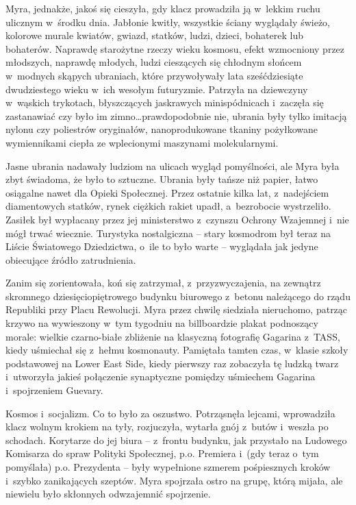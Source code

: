 \documentclass[oneside,polish,11pt,sfheadings]{mwbk}
\begin{document}
Myra, jednakże, jakoś się cieszyła, gdy klacz prowadziła ją w~lekkim
ruchu ulicznym w~środku dnia. Jabłonie kwitły, wszystkie ściany wyglądały
świeżo, kolorowe murale kwiatów, gwiazd, statków, ludzi, dzieci,
bohaterek lub bohaterów. Naprawdę starożytne rzeczy wieku kosmosu, efekt
wzmocniony przez młodszych, naprawdę młodych, ludzi cieszących się
chłodnym słońcem w~modnych skąpych ubraniach, które przywoływały lata
sześćdziesiąte dwudziestego wieku w~ich wesołym futuryzmie. Patrzyła na
dziewczyny w~wąskich trykotach, błyszczących jaskrawych minispódnicach i~zaczęła się zastanawiać czy było im zimno\ldots prawdopodobnie nie, ubrania
były tylko imitacją nylonu czy poliestrów oryginałów, nanoprodukowane
tkaniny pożyłkowane wymiennikami ciepła ze wplecionymi maszynami
molekularnymi.

Jasne ubrania nadawały ludziom na ulicach wygląd pomyślności, ale Myra
była zbyt świadoma, że było to sztuczne. Ubrania były tańsze niż papier,
łatwo osiągalne nawet dla Opieki Społecznej. Przez ostatnie kilka lat, z~nadejściem diamentowych statków, rynek ciężkich rakiet upadł, a~bezrobocie wystrzeliło. Zasiłek był wypłacany przez jej ministerstwo z~czynszu Ochrony Wzajemnej i~nie mógł trwać wiecznie. Turystyka
nostalgiczna -- stary kosmodrom był teraz na Liście Światowego
Dziedzictwa, o~ile to było warte -- wyglądała jak jedyne obiecujące
źródło zatrudnienia.

Zanim się zorientowała, koń się zatrzymał, z~przyzwyczajenia, na
zewnątrz skromnego dziesięciopiętrowego budynku biurowego z~betonu
należącego do rządu Republiki przy Placu Rewolucji. Myra przez chwilę
siedziała nieruchomo, patrząc krzywo na wywieszony w~tym tygodniu na
billboardzie plakat podnoszący morale: wielkie czarno-białe zbliżenie na
klasyczną fotografię Gagarina z~TASS, kiedy uśmiechał się z~hełmu
kosmonauty. Pamiętała tamten czas, w~klasie szkoły podstawowej na Lower
East Side, kiedy pierwszy raz zobaczyła tę ludzką twarz i~utworzyła
jakieś połączenie synaptyczne pomiędzy uśmiechem Gagarina i~spojrzeniem
Guevary.

Kosmos i~socjalizm. Co to było za oszustwo. Potrząsnęła lejcami,
wprowadziła klacz wolnym krokiem na tyły, rozjuczyła, wytarła gnój z~butów i~weszła po schodach. Korytarze do jej biura -- z~frontu budynku,
jak przystało na Ludowego Komisarza do spraw Polityki Społecznej, p.o.
Premiera i~(gdy teraz o~tym pomyślała) p.o. Prezydenta -- były wypełnione
szmerem pośpiesznych kroków i~szybko zanikających szeptów. Myra
spojrzała ostro na grupę, którą mijała, ale niewielu było skłonnych
odwzajemnić spojrzenie.
\end{document}
